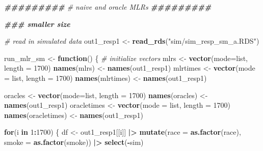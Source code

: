\documentclass[12pt, twoside]{amherstthesis}
\newenvironment{Shaded}{\begin{snugshade}}{\end{snugshade}}
\newcommand{\AttributeTok}[1]{\textcolor[rgb]{0.13,0.29,0.53}{#1}}
\newcommand{\CommentTok}[1]{\textcolor[rgb]{0.56,0.35,0.01}{\textit{#1}}}
\newcommand{\ControlFlowTok}[1]{\textcolor[rgb]{0.13,0.29,0.53}{\textbf{#1}}}
\newcommand{\DecValTok}[1]{\textcolor[rgb]{0.00,0.00,0.81}{#1}}
\newcommand{\DocumentationTok}[1]{\textcolor[rgb]{0.56,0.35,0.01}{\textbf{\textit{#1}}}}
\newcommand{\FunctionTok}[1]{\textcolor[rgb]{0.13,0.29,0.53}{\textbf{#1}}}
\newcommand{\NormalTok}[1]{#1}
\newcommand{\OtherTok}[1]{\textcolor[rgb]{0.56,0.35,0.01}{#1}}
\newcommand{\SpecialCharTok}[1]{\textcolor[rgb]{0.81,0.36,0.00}{\textbf{#1}}}
\newcommand{\StringTok}[1]{\textcolor[rgb]{0.31,0.60,0.02}{#1}}
\begin{document}
\scriptsize
\begin{Shaded}
\begin{Highlighting}[]
\DocumentationTok{\#\#\#\#\#\#\#\#\#}
\CommentTok{\# naive and oracle MLRs }
\DocumentationTok{\#\#\#\#\#\#\#\#\#}

\DocumentationTok{\#\#\# smaller size}

\CommentTok{\# read in simulated data}
\NormalTok{out1\_resp1 }\OtherTok{\textless{}{-}} \FunctionTok{read\_rds}\NormalTok{(}\StringTok{"sim/sim\_resp\_sm\_a.RDS"}\NormalTok{)}

\NormalTok{run\_mlr\_sm }\OtherTok{\textless{}{-}} \ControlFlowTok{function}\NormalTok{() \{}
  \CommentTok{\# initialize vectors}
\NormalTok{  mlrs }\OtherTok{\textless{}{-}} \FunctionTok{vector}\NormalTok{(}\AttributeTok{mode=}\StringTok{\textquotesingle{}list\textquotesingle{}}\NormalTok{, }\AttributeTok{length =} \DecValTok{1700}\NormalTok{)}
  \FunctionTok{names}\NormalTok{(mlrs) }\OtherTok{\textless{}{-}} \FunctionTok{names}\NormalTok{(out1\_resp1)}
\NormalTok{  mlrtimes }\OtherTok{\textless{}{-}} \FunctionTok{vector}\NormalTok{(}\AttributeTok{mode =} \StringTok{\textquotesingle{}list\textquotesingle{}}\NormalTok{, }\AttributeTok{length =} \DecValTok{1700}\NormalTok{)}
  \FunctionTok{names}\NormalTok{(mlrtimes) }\OtherTok{\textless{}{-}} \FunctionTok{names}\NormalTok{(out1\_resp1)}
  
\NormalTok{  oracles }\OtherTok{\textless{}{-}} \FunctionTok{vector}\NormalTok{(}\AttributeTok{mode=}\StringTok{\textquotesingle{}list\textquotesingle{}}\NormalTok{, }\AttributeTok{length =} \DecValTok{1700}\NormalTok{)}
  \FunctionTok{names}\NormalTok{(oracles) }\OtherTok{\textless{}{-}} \FunctionTok{names}\NormalTok{(out1\_resp1)}
\NormalTok{  oracletimes }\OtherTok{\textless{}{-}} \FunctionTok{vector}\NormalTok{(}\AttributeTok{mode =} \StringTok{\textquotesingle{}list\textquotesingle{}}\NormalTok{, }\AttributeTok{length =} \DecValTok{1700}\NormalTok{)}
  \FunctionTok{names}\NormalTok{(oracletimes) }\OtherTok{\textless{}{-}} \FunctionTok{names}\NormalTok{(out1\_resp1)}
  
  \ControlFlowTok{for}\NormalTok{(i }\ControlFlowTok{in} \DecValTok{1}\SpecialCharTok{:}\DecValTok{1700}\NormalTok{) \{}
\NormalTok{    df }\OtherTok{\textless{}{-}}\NormalTok{ out1\_resp1[[i]] }\SpecialCharTok{|\textgreater{}} 
      \FunctionTok{mutate}\NormalTok{(}\AttributeTok{race =} \FunctionTok{as.factor}\NormalTok{(race), }\AttributeTok{smoke =} \FunctionTok{as.factor}\NormalTok{(smoke)) }\SpecialCharTok{|\textgreater{}} 
      \FunctionTok{select}\NormalTok{(}\SpecialCharTok{{-}}\NormalTok{sim)}
    

\end{Highlighting}
\end{Shaded}
\end{document}
